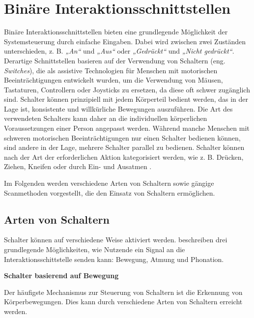 \section{Binäre Interaktionsschnittstellen}

Binäre Interaktionsschnittstellen bieten eine grundlegende Möglichkeit der Systemsteuerung durch einfache Eingaben. Dabei wird zwischen zwei Zuständen unterschieden, z. B.  \textit{„An“} und \textit{„Aus“} oder \textit{„Gedrückt“} und \textit{„Nicht gedrückt“}. Derartige Schnittstellen basieren auf der Verwendung von Schaltern (eng. \textit{Switches}), die als assistive Technologien für Menschen mit motorischen Beeinträchtigungen entwickelt wurden, um die Verwendung von Mäusen, Tastaturen, Controllern oder Joysticks zu ersetzen, da diese oft schwer zugänglich sind. Schalter können prinzipiell mit jedem Körperteil bedient werden, das in der Lage ist, konsistente und willkürliche Bewegungen auszuführen. Die Art des verwendeten Schalters kann daher an die individuellen körperlichen Voraussetzungen einer Person angepasst werden. Während manche Menschen mit schweren motorischen Beeinträchtigungen nur einen Schalter bedienen können, sind andere in der Lage, mehrere Schalter parallel zu bedienen. Schalter können nach der Art der erforderlichen Aktion kategorisiert werden, wie z. B.  Drücken, Ziehen, Kneifen oder durch Ein- und Ausatmen \citep{yuan_game_2011, Weber22111996}. 

Im Folgenden werden verschiedene Arten von Schaltern sowie gängige Scanmethoden vorgestellt, die den Einsatz von Schaltern ermöglichen.

\subsection{Arten von Schaltern}

Schalter können auf verschiedene Weise aktiviert werden. \citet{cook_chapter_2015} beschreiben drei grundlegende Möglichkeiten, wie Nutzende ein Signal an die Interaktionsschittstelle senden kann: Bewegung, Atmung und Phonation.

\textbf{Schalter basierend auf Bewegung}

Der häufigste Mechanismus zur Steuerung von Schaltern ist die Erkennung von Körperbewegungen. Dies kann durch verschiedene Arten von Schaltern erreicht werden.

